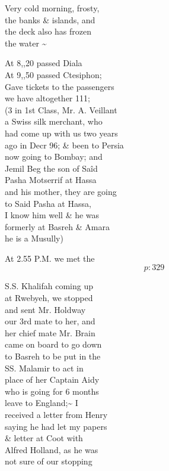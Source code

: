 \documentclass{report}
\begin{document}
	\par{
 	Very cold morning, frosty,\ \\the banks \& islands, and\ \\the deck also has frozen\ \\the water \~{}\ \\
	}

	\par{
 	At 8,,20 passed Diala\ \\At 9,,50 passed Ctesiphon;\ \\Gave tickets to the passengers\ \\we have altogether 111;\ \\(3 in 1st Class, Mr. A. Veillant\ \\a Swiss silk merchant, who\ \\had come up with us two years\ \\ago in Decr 96; \& been to Persia\ \\now going to Bombay; and\ \\Jemil Beg the son of Saîd\ \\Pasha Motserrif at Hassa\ \\and his mother, they are going\ \\to Said Pasha at Hassa,\ \\I know him well \& he was\ \\formerly at Basreh \& Amara\ \\he is a Musully)\ \\
	}

	\par{
 	At 2.55 P.M. we met the\ \\
  \[p: 329 \]

	}



	\par{
 	S.S. Khalifah coming up\ \\at Rwebyeh, we stopped\ \\and sent Mr. Holdway\ \\our 3rd mate to her, and\ \\her chief mate Mr. Brain\ \\came on board to go down\ \\to Basreh to be put in the\ \\SS. Malamir to act in\ \\place of her Captain Aidy\ \\who is going for 6 months\ \\leave to England;\~{} I\ \\received a letter from Henry\ \\saying he had let my papers\ \\\& letter at Coot with\ \\Alfred Holland, as he was\ \\not sure of our stopping\ \\
	}
\end{document}
